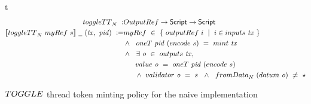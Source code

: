 %

\begin{ruledfigure}{t}
  \begin{align*}
    \toggleTT_N~:& \OutputRef \to \Script \to \Script \\
    \applyMPScript{\toggleTT_N~ \mathsf{myRef}~s}~\wcard~(\var{tx},~\var{pid})~\leteq&
    \mathsf{myRef}~\in~ \{ ~\outputref~i~\mid~i \in \inputs~\var{tx}~\} \\
    & \wedge ~~\fun{oneT}~\var{pid}~(\fun{encode}~s) ~=~ \mint~\var{tx} \\
    & \wedge ~~ \exists~\var{o}~\in~\fun{outputs}~\var{tx}, \\
    &~~~~~\val~\var{o}~=~\mathsf{oneT}~\var{pid}~(\fun{encode}~s) \\
    & ~~~~~\wedge ~\validator~\var{o}~=~s~~\wedge ~~\fun{fromData}_N~(\datum~\var{o})~\neq~\emptytype
  \end{align*}
\caption{$\TOGGLE$ thread token minting policy for the naive implementation}
\label{fig:toggle-tt-n}
\end{ruledfigure}

